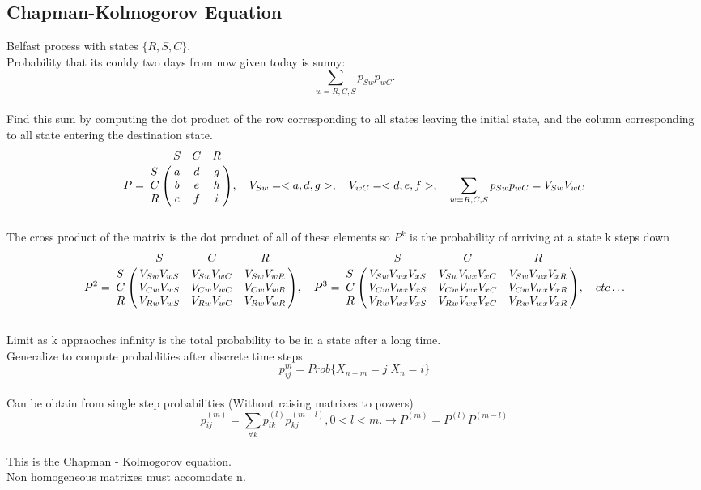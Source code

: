 \documentclass{article}
\begin{document}
	\subsection {Chapman-Kolmogorov Equation}
	Belfast process with states $\{R,S,C\}$. 
	\\Probability that its couldy two days from now given today is sunny: 
	\[ \sum\limits_{w=R,C,S}{p_{Sw}p_{wC}}. \]
	\\Find this sum by computing the dot product of the row corresponding to all states leaving the initial state, and the column corresponding to all state
	entering the destination state. 
	\[P = \bordermatrix{   
              & S    & C    & R    \cr
            S & a & d & g \cr
			C & b & e & h \cr
			R & c & f & i } 
			, \quad V_{Sw} = <a,d,g>
			, \quad V_{wC} = <d,e,f>
			, \quad \sum\limits_{w=R,C,S}{p_{Sw}p_{wC}} = V_{Sw}V_{wC}
    \]
	\\The cross product of the matrix is the dot product of all of these elements so $P^k$ is the probability of arriving at a state k steps down
	\[P^2= \bordermatrix{   
              & S    & C    & R    \cr
            S & V_{Sw}V_{wS} & V_{Sw}V_{wC} & V_{Sw}V_{wR} \cr
			C & V_{Cw}V_{wS} & V_{Cw}V_{wC} & V_{Cw}V_{wR} \cr
			R & V_{Rw}V_{wS} & V_{Rw}V_{wC} & V_{Rw}V_{wR} }  
	 ,\quad P^3= \bordermatrix{   
              & S    & C    & R    \cr
            S & V_{Sw}V_{wx}V_{xS} & V_{Sw}V_{wx}V_{xC} & V_{Sw}V_{wx}V_{xR} \cr
			C & V_{Cw}V_{wx}V_{xS} & V_{Cw}V_{wx}V_{xC} & V_{Cw}V_{wx}V_{xR} \cr
			R & V_{Rw}V_{wx}V_{xS} & V_{Rw}V_{wx}V_{xC} & V_{Rw}V_{wx}V_{xR} }  
	,\quad etc\ldots \]
	\\Limit as k appraoches infinity is the total probability to be in a state after a long time.  
	\\Generalize to compute probablities after discrete time steps 
	\[ p_{ij}^{m} = Prob\{ X_{n+m} = j | X_{n} = i \} \]
	\\Can be obtain from single step probabilities (Without raising matrixes to powers)
	\[ p_{ij}^{(m)} = \sum\limits_{\forall k}{p_{ik}^{(l)}p_{kj}^{(m-l)}}, 0 < l < m. \rightarrow P^{(m)} = P^{(l)}P^{(m-l)}\]
	\\This is the Chapman - Kolmogorov equation.
	\\Non homogeneous matrixes must accomodate n. 
\end{document}
